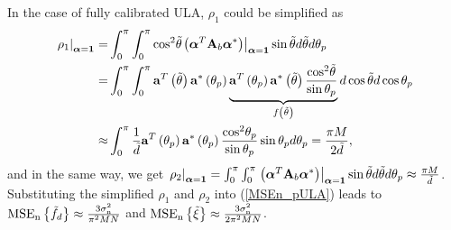 \documentclass[12pt, draftclsnofoot, onecolumn]{IEEEtran}
\begin{document}
In the case of fully calibrated ULA, ${\rho_{1}}$ could be simplified as
\begin{align}\label{rho1}
 {{\left. {{\rho }_{1}} \right|}_{\boldsymbol{\alpha }=\mathbf{1}}}= & \int_{0}^{ \rm{\pi} }{\int_{0}^{ \rm{\pi} } {{{\cos }^{2}}\tilde{\theta }{{\left. \left( {{\boldsymbol{\alpha }}^{T}}{{\mathbf{A}}_{b}}{{\boldsymbol{\alpha }}^{*}} \right) \right|}_{\boldsymbol{\alpha }=\mathbf{1}}}\sin \tilde{\theta }d\tilde{\theta }}d{{\theta }_{p}}} \nonumber \\
= & \int_{0}^{ \rm{\pi} }\int_{0}^{ \rm{\pi} } {{\mathbf{a}}^{T}}\left( {\tilde{\theta }} \right) {{\mathbf{a}}^{*}}\left( {{\theta }_{p}} \right)  \underbrace{{{\mathbf{a}}^{T}}\left( {{\theta }_{p}} \right) {{\mathbf{a}}^{*}}\left( {\tilde{\theta }} \right) \frac{{{\cos }^{2}}\tilde{\theta } }{\sin {{\theta }_{p}}}}_{f\left( {\tilde{\theta }} \right)}d\cos \tilde{\theta }d\cos {{\theta }_{p}} \nonumber \\
\approx & \int_{0}^{ \rm{\pi} }{\frac{1}{\tilde{d}} {{\mathbf{a}}^{T}}\left( {{\theta }_{p}} \right) {{\mathbf{a}}^{*}}\left( {{\theta }_{p}} \right) \frac{{{\cos }^{2}}{{\theta }_{p}}}{\sin {{\theta }_{p}}}\sin {{\theta }_{p}}d{{\theta }_{p}}} =\frac{{ \rm{\pi} }M}{2\tilde{d}},
\end{align}
and in the same way, we get ${\left. {{\rho }_{2}} \right|}_{\boldsymbol{\alpha } = \mathbf{1}} = \int_{0}^{ \rm{\pi} }{\int_{0}^{ \rm{\pi} } {{{\left. \left( {{\boldsymbol{\alpha }}^{T}}{{\mathbf{A}}_{b}}{{\boldsymbol{\alpha }}^{*}} \right) \right|}_{\boldsymbol{\alpha }=\mathbf{1}}}\sin \tilde{\theta }d\tilde{\theta }}d{{\theta }_{p}}} \approx \frac{{ \rm{\pi} }M}{\tilde{d}}$.
Substituting the simplified ${\rho_{1}}$ and ${\rho_{2}}$ into (\ref{MSEn_pULA}) leads to
${{\text{MSE}}_{\mathrm{n}}}\left\{ {{{\tilde{f}}}_{d}} \right\} \approx \frac{3\sigma _{\mathrm{n}}^{2}}{{{ \rm{\pi} }^{2}}MN}$ and ${{\text{MSE}}_{\mathrm{n}}}\left\{ {\tilde{\xi }} \right\} \approx \frac{3\sigma _{\mathrm{n}}^{2}}{\text{2}{{ \rm{\pi} }^{2}}MN}$.
\end{document}
